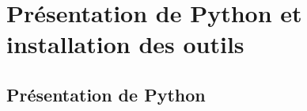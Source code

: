 \documentclass[12pt,a4paper,oneside]{report}
\begin{document}







\chapter{Présentation de Python et installation des outils}

\section{Présentation de Python}

\end{document}
